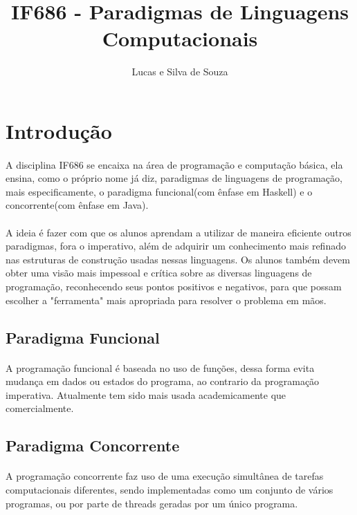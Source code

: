 \documentclass[a4paper]{article}
\title{IF686 - Paradigmas de Linguagens Computacionais}
\author{Lucas e Silva de Souza}
\begin{document}
\maketitle 

\section{Introdução}

\paragraph{} A disciplina IF686 se encaixa na área de programação e computação básica, ela ensina, como o próprio nome já diz, paradigmas de linguagens de programação, mais especificamente, o paradigma funcional(com ênfase em Haskell) e o concorrente(com ênfase em Java). 
\paragraph{} A ideia é fazer com que os alunos aprendam a utilizar de maneira eficiente outros paradigmas, fora o imperativo, além de adquirir um conhecimento mais refinado nas estruturas de construção usadas nessas linguagens. Os alunos também devem obter uma visão mais impessoal e crítica sobre as diversas linguagens de programação, reconhecendo seus pontos positivos e negativos, para que possam escolher a "ferramenta" mais apropriada para resolver o problema em mãos.  

\subsection{Paradigma Funcional}

\paragraph{} A programação funcional é baseada no uso de funções, dessa forma evita mudança em dados ou estados do programa, ao contrario da programação imperativa. Atualmente tem sido mais usada academicamente que comercialmente. 

\subsection{Paradigma Concorrente}

\paragraph{} A programação concorrente faz uso de uma execução simultânea de tarefas computacionais diferentes, sendo implementadas como um conjunto de vários programas, ou por parte de threads geradas por um único programa.
\end{document}
